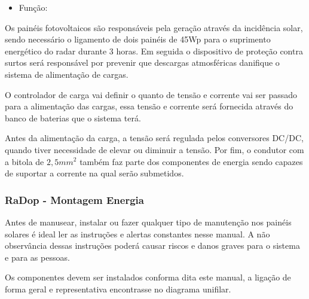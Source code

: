               \begin{itemize}
                 \item Função:
             \end{itemize}
             
Os painéis fotovoltaicos são responsáveis pela geração através da incidência solar, sendo necessário o ligamento de dois painéis de 45Wp para o suprimento energético do radar durante 3 horas. Em seguida o dispositivo de proteção contra surtos será responsável por prevenir que descargas atmosféricas danifique o sistema de alimentação de cargas.
             
O controlador de carga vai definir o quanto de tensão e corrente vai ser passado para a alimentação das cargas, essa tensão e corrente será fornecida através do banco de baterias que o sistema terá.
             
Antes da alimentação da carga, a tensão será regulada pelos conversores DC/DC, quando tiver necessidade de elevar ou diminuir a tensão. Por fim, o condutor com a bitola de $2,5 mm^2$  também faz parte dos componentes de energia sendo capazes de suportar a corrente na qual serão submetidos.
             
    \subsubsection{RaDop - Montagem Energia}
             
    Antes de manusear, instalar ou fazer qualquer tipo de manutenção nos painéis solares é ideal ler as instruções e alertas constantes nesse manual. A não observância dessas instruções poderá causar riscos e danos graves para o sistema e para as pessoas. 
             
    Os componentes devem ser instalados conforma dita este manual, a ligação de forma geral e representativa encontrasse no diagrama unifilar.
             
